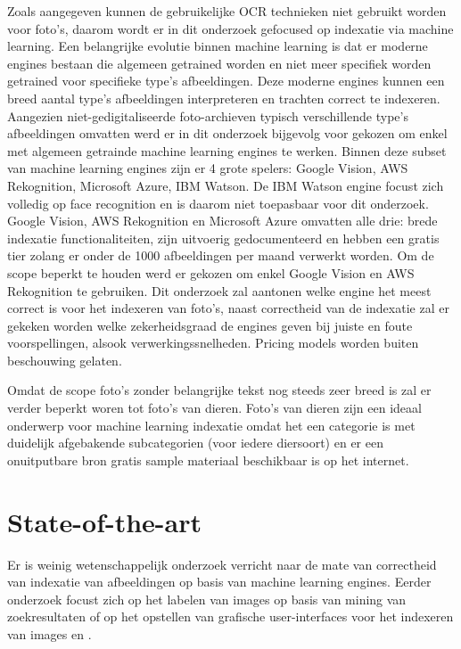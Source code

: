 Zoals aangegeven kunnen de gebruikelijke OCR technieken niet gebruikt worden voor foto's, daarom wordt er in dit onderzoek gefocused op indexatie via machine learning. Een belangrijke evolutie binnen machine learning is dat er moderne engines bestaan die algemeen getrained worden en niet meer specifiek worden getrained voor specifieke type's afbeeldingen. Deze moderne engines kunnen een breed aantal type's afbeeldingen interpreteren en trachten correct te indexeren.
Aangezien niet-gedigitaliseerde foto-archieven typisch verschillende type's afbeeldingen omvatten werd er in dit onderzoek bijgevolg voor gekozen om enkel met algemeen getrainde machine learning engines te werken. Binnen deze subset van machine learning engines zijn er 4 grote spelers: Google Vision, AWS Rekognition, Microsoft Azure, IBM Watson. De IBM Watson engine focust zich volledig op face recognition en is daarom niet toepasbaar voor dit onderzoek. Google Vision, AWS Rekognition en Microsoft Azure omvatten alle drie: brede indexatie functionaliteiten, zijn uitvoerig gedocumenteerd en hebben een gratis tier zolang er onder de 1000 afbeeldingen per maand verwerkt worden. Om de scope beperkt te houden werd er gekozen om enkel Google Vision en AWS Rekognition te gebruiken.
Dit onderzoek zal aantonen welke engine het meest correct is voor het indexeren van foto's, naast correctheid van de indexatie zal er gekeken worden welke zekerheidsgraad de engines geven bij juiste en foute voorspellingen, alsook verwerkingssnelheden. Pricing models worden buiten beschouwing gelaten.

Omdat de scope foto's zonder belangrijke tekst nog steeds zeer breed is zal er verder beperkt woren tot foto's van dieren. Foto's van dieren zijn een ideaal onderwerp voor machine learning indexatie omdat het een categorie is met duidelijk afgebakende subcategorien (voor iedere diersoort) en er een onuitputbare bron gratis sample materiaal beschikbaar is op het internet.


\section{State-of-the-art}
\label{sec:state-of-the-art}

Er is weinig wetenschappelijk onderzoek verricht naar de mate van correctheid van indexatie van afbeeldingen op basis van machine learning engines. Eerder onderzoek focust zich op het labelen van images op basis van mining van zoekresultaten \autocite{Wang2008} of op het opstellen van grafische user-interfaces voor het indexeren van images \autocite{LuisvonAhn2004} en \autocite{JuliaMoehrmann2012}.

